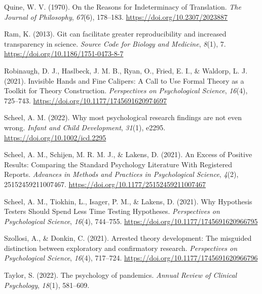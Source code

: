 \documentclass[
  man,floatsintext]{apa6}
\newlength{\cslhangindent}
\newenvironment{CSLReferences}[2] %
 {\begin{list}{}{%
  \setlength{\itemindent}{0pt}
  \setlength{\leftmargin}{0pt}
  \setlength{\parsep}{0pt}
  \ifodd #1
   \setlength{\leftmargin}{\cslhangindent}
   \setlength{\itemindent}{-1\cslhangindent}
  \fi
  \setlength{\itemsep}{#2\baselineskip}}}
 {\end{list}}
\begin{document}
\begin{CSLReferences}{1}{0}
Quine, W. V. (1970). On the {Reasons} for {Indeterminacy} of {Translation}. \emph{The Journal of Philosophy}, \emph{67}(6), 178--183. \url{https://doi.org/10.2307/2023887}

Ram, K. (2013). Git can facilitate greater reproducibility and increased transparency in science. \emph{Source Code for Biology and Medicine}, \emph{8}(1), 7. \url{https://doi.org/10.1186/1751-0473-8-7}

Robinaugh, D. J., Haslbeck, J. M. B., Ryan, O., Fried, E. I., \& Waldorp, L. J. (2021). Invisible {Hands} and {Fine Calipers}: {A Call} to {Use Formal Theory} as a {Toolkit} for {Theory Construction}. \emph{Perspectives on Psychological Science}, \emph{16}(4), 725--743. \url{https://doi.org/10.1177/1745691620974697}

Scheel, A. M. (2022). Why most psychological research findings are not even wrong. \emph{Infant and Child Development}, \emph{31}(1), e2295. \url{https://doi.org/10.1002/icd.2295}

Scheel, A. M., Schijen, M. R. M. J., \& Lakens, D. (2021). An {Excess} of {Positive Results}: {Comparing} the {Standard Psychology Literature With Registered Reports}. \emph{Advances in Methods and Practices in Psychological Science}, \emph{4}(2), 25152459211007467. \url{https://doi.org/10.1177/25152459211007467}

Scheel, A. M., Tiokhin, L., Isager, P. M., \& Lakens, D. (2021). Why {Hypothesis Testers Should Spend Less Time Testing Hypotheses}. \emph{Perspectives on Psychological Science}, \emph{16}(4), 744--755. \url{https://doi.org/10.1177/1745691620966795}

Szollosi, A., \& Donkin, C. (2021). Arrested theory development: {The} misguided distinction between exploratory and confirmatory research. \emph{Perspectives on Psychological Science}, \emph{16}(4), 717--724. \url{https://doi.org/10.1177/1745691620966796}

Taylor, S. (2022). The psychology of pandemics. \emph{Annual Review of Clinical Psychology}, \emph{18}(1), 581--609.


\end{CSLReferences}
\end{document}
